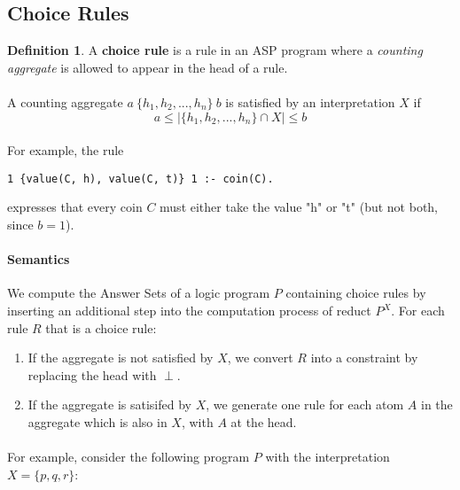 \documentclass{article}
\theoremstyle{plain}
\theoremstyle{definition}
\newtheorem{defn}[thm]{Definition} %
\begin{document}
\begin{multicols}{2}
\subsection{Choice Rules}\label{sec:ASPChoiceRules}

\begin{defn}A \textbf{choice rule} is a rule in an ASP program where a \textit{counting aggregate} is allowed to appear in the head of a rule.\end{defn}

\paragraph{} A counting aggregate $a\ \{ h_1, h_2, ..., h_n \}\ b$ is satisfied by an interpretation $X$ if $$a \leq |\{h_1, h_2, ..., h_n \} \cap X| \leq b$$

\paragraph{} For example, the rule 

\begin{lstlisting}
1 {value(C, h), value(C, t)} 1 :- coin(C).
\end{lstlisting}

expresses that every coin $C$ must either take the value "h" or "t" (but not both, since $b = 1$).

\paragraph{Semantics} We compute the Answer Sets of a logic program $P$ containing choice rules by inserting an additional step into the computation process of reduct $P^X$. For each rule $R$ that is a choice rule:

\begin{enumerate}
\item If the aggregate is not satisfied by $X$, we convert $R$ into a constraint by replacing the head with $\perp$.
\item If the aggregate is satisifed by $X$, we generate one rule for each atom $A$ in the aggregate which is also in $X$, with $A$ at the head.
\end{enumerate}

\paragraph{} For example, consider the following program $P$ with the interpretation $X = \{p, q, r\}$:


\end{multicols}
\end{document}
